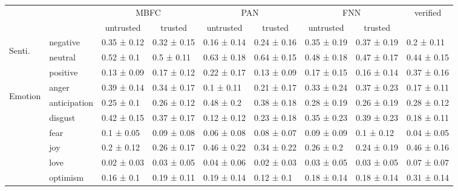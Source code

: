 \begin{table}
\centering
\begin{adjustbox}{width=\textwidth,center}
\begin{tabular}{llll|ll|ll|l}
 & \multirow{2}{*}{} & \multicolumn{2}{c|}{MBFC} & \multicolumn{2}{c|}{PAN} & \multicolumn{2}{c|}{FNN} & \multicolumn{1}{c}{\multirow{2}{*}{verified}} \\ \cline{3-8}
 &  & \multicolumn{1}{c}{untrusted} & \multicolumn{1}{c|}{trusted} & \multicolumn{1}{c}{untrusted} & \multicolumn{1}{c|}{trusted} & \multicolumn{1}{c}{untrusted} & \multicolumn{1}{c|}{trusted} & \multicolumn{1}{c}{} \\ \hline
\multirow{3}{*}{\begin{turn}{90}Senti.\end{turn}} & negative & 0.35 ± 0.12 & 0.32 ± 0.15 & 0.16 ± 0.14 & 0.24 ± 0.16 & 0.35 ± 0.19 & 0.37 ± 0.19 & 0.2 ± 0.11 \\
 & neutral & 0.52 ± 0.1 & 0.5 ± 0.11 & 0.63 ± 0.18 & 0.64 ± 0.15 & 0.48 ± 0.18 & 0.47 ± 0.17 & 0.44 ± 0.15 \\
 & positive & \multicolumn{1}{c}{0.13 ± 0.09} & \multicolumn{1}{c|}{0.17 ± 0.12} & \multicolumn{1}{c}{0.22 ± 0.17} & \multicolumn{1}{c|}{0.13 ± 0.09} & \multicolumn{1}{c}{0.17 ± 0.15} & \multicolumn{1}{c|}{0.16 ± 0.14} & \multicolumn{1}{c}{0.37 ± 0.16} \\ \hline
\multirow{11}{*}{\begin{turn}{90}Emotion\end{turn}} & anger & 0.39 ± 0.14 & 0.34 ± 0.17 & 0.1 ± 0.11 & 0.21 ± 0.17 & 0.33 ± 0.24 & 0.37 ± 0.23 & 0.17 ± 0.11 \\
 & anticipation & 0.25 ± 0.1 & 0.26 ± 0.12 & 0.48 ± 0.2 & 0.38 ± 0.18 & 0.28 ± 0.19 & 0.26 ± 0.19 & 0.28 ± 0.12 \\
 & disgust & 0.42 ± 0.15 & 0.37 ± 0.17 & 0.12 ± 0.12 & 0.23 ± 0.18 & 0.35 ± 0.23 & 0.39 ± 0.23 & 0.18 ± 0.11 \\
 & fear & 0.1 ± 0.05 & 0.09 ± 0.08 & 0.06 ± 0.08 & 0.08 ± 0.07 & 0.09 ± 0.09 & 0.1 ± 0.12 & 0.04 ± 0.05 \\
 & joy & 0.2 ± 0.12 & 0.26 ± 0.17 & 0.46 ± 0.22 & 0.34 ± 0.22 & 0.26 ± 0.2 & 0.24 ± 0.19 & 0.46 ± 0.16 \\
 & love & 0.02 ± 0.03 & 0.03 ± 0.05 & 0.04 ± 0.06 & 0.02 ± 0.03 & 0.03 ± 0.05 & 0.03 ± 0.05 & 0.07 ± 0.07 \\
 & optimism & 0.16 ± 0.1 & 0.19 ± 0.11 & 0.19 ± 0.14 & 0.12 ± 0.1 & 0.18 ± 0.14 & 0.18 ± 0.14 & 0.31 ± 0.14 \\

\end{tabular}
\end{adjustbox}
\end{table}
